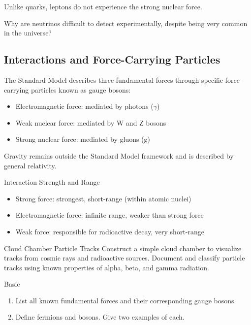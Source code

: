 Unlike quarks, leptons do not experience the strong nuclear force.

\begin{stopandthink}
Why are neutrinos difficult to detect experimentally, despite being very common in the universe?
\end{stopandthink}

\subsection{Interactions and Force-Carrying Particles}
\FloatBarrier

The Standard Model describes three fundamental forces through specific force-carrying particles known as gauge bosons:

\begin{itemize}
    \item Electromagnetic force: mediated by photons ($\gamma$)
    \item Weak nuclear force: mediated by W and Z bosons
    \item Strong nuclear force: mediated by gluons (g)
\end{itemize}

Gravity remains outside the Standard Model framework and is described by general relativity.

\begin{keyconcept}{Interaction Strength and Range}
\begin{itemize}
    \item Strong force: strongest, short-range (within atomic nuclei)
    \item Electromagnetic force: infinite range, weaker than strong force
    \item Weak force: responsible for radioactive decay, very short-range
\end{itemize}
\end{keyconcept}

\begin{investigation}{Cloud Chamber Particle Tracks}
Construct a simple cloud chamber to visualize tracks from cosmic rays and radioactive sources. Document and classify particle tracks using known properties of alpha, beta, and gamma radiation.
\end{investigation}

\begin{tieredquestions}{Basic}
\begin{enumerate}
    \item List all known fundamental forces and their corresponding gauge bosons.
    \item Define fermions and bosons. Give two examples of each.
\end{enumerate}
\end{tieredquestions}

